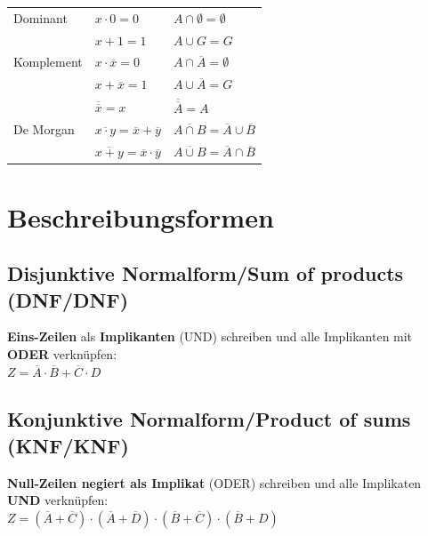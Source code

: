 \documentclass[6pt,a4paper]{scrartcl}
\newcommand{\ol}[1]{\ensuremath{\overline{#1}}}									%
\begin{document}
\begin{multicols*}{3}
\begin{tabular}{l|l|l}
    Dominant    & $x \cdot 0 = 0$                                       & $A \cap \emptyset = \emptyset$                        \\
                & $x + 1 = 1$                                           & $A \cup G = G$                                        \\
    Komplement  & $x \cdot \overline{x} = 0$                            & $A \cap \overline{A} = \emptyset$                     \\
                & $x + \overline{x} = 1$                                & $A \cup \overline{A} = G$                             \\
                & $\overline{\overline{x}} = x$                         & $\overline{\overline{A}} = A$                         \\
    De Morgan   & $\overline{x \cdot y} = \overline{x} + \overline{y}$  & $\overline{A \cap B} = \overline{A} \cup \overline{B}$\\
                & $\overline{x + y} = \overline{x} \cdot \overline{y}$  & $\overline{A \cup B} = \overline{A} \cap \overline{B}$ \\
  \end{tabular}


\section{Beschreibungsformen}
	\subsection{Disjunktive Normalform/Sum of products (DNF/DNF)}
	\textbf{Eins-Zeilen} als \textbf{Implikanten} (UND) schreiben und alle Implikanten mit \textbf{ODER} verknüpfen: \\
	$Z = \overline A \cdot \overline B + \overline C \cdot D$

	\subsection{Konjunktive Normalform/Product of sums (KNF/KNF)}
	\textbf{Null-Zeilen negiert als Implikat} (ODER)  schreiben und alle Implikaten \textbf{UND} verknüpfen: \\
	$Z = ( \ol A + \ol C) \cdot ( \ol A + \ol D) \cdot ( \ol B + \ol C) \cdot ( \ol B + D)$


\end{multicols*}
\end{document}
